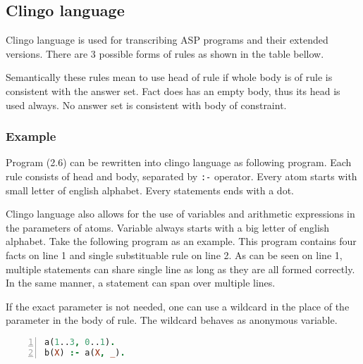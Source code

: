 \documentclass{fithesis}
\begin{document}
\subsection{Clingo language}
Clingo language is used for transcribing ASP programs and their extended versions.
There are 3 possible forms of rules as shown in the table bellow.
{\setlength{\tabcolsep}{0.2em}%
\begin{center}
\end{center}}\noindent
Semantically these rules mean to use head of rule if whole body is of rule
is consistent with the answer set. Fact does has an empty body, thus its
head is used always. No answer set is consistent with body of constraint.

\subsubsection{Example}
Program (2.6) can be rewritten into clingo language as following
program.
Each rule consists of head and body, separated by \texttt{:-} operator.
Every atom starts with small letter of english alphabet.
Every statements ends with a dot.

Clingo language also allows for the use of variables and arithmetic expressions
in the parameters of atoms. Variable always starts with a big letter of english
alphabet. Take the following program as an example.
This program contains four facts on line 1 and single substituable rule on line 2.
As can be seen on line 1, multiple statements can share single line as long as
they are all formed correctly. In the same manner, a statement can span over
multiple lines.

If the exact parameter is not needed, one can use a wildcard in the place of
the parameter in the body of rule. The wildcard behaves as anonymous variable.
\begin{lstlisting}[language=prolog, numbers=left, countblanklines=false]
a(1..3, 0..1).
b(X) :- a(X, _).
\end{lstlisting}
\end{document}
